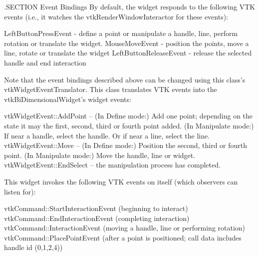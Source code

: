 .S\-E\-C\-T\-I\-O\-N Event Bindings By default, the widget responds to the following V\-T\-K events (i.\-e., it watches the vtk\-Render\-Window\-Interactor for these events)\-: 
\begin{DoxyPre}
   LeftButtonPressEvent - define a point or manipulate a handle, line,
                          perform rotation or translate the widget.
   MouseMoveEvent - position the points, move a line, rotate or translate the widget
   LeftButtonReleaseEvent - release the selected handle and end interaction
 \end{DoxyPre}


Note that the event bindings described above can be changed using this class's vtk\-Widget\-Event\-Translator. This class translates V\-T\-K events into the vtk\-Bi\-Dimensional\-Widget's widget events\-: 
\begin{DoxyPre}
   vtkWidgetEvent::AddPoint -- (In Define mode:) Add one point; depending on the 
                               state it may the first, second, third or fourth 
                               point added. (In Manipulate mode:) If near a handle, 
                               select the handle. Or if near a line, select the line.
   vtkWidgetEvent::Move -- (In Define mode:) Position the second, third or fourth 
                           point. (In Manipulate mode:) Move the handle, line or widget.
   vtkWidgetEvent::EndSelect -- the manipulation process has completed.
 \end{DoxyPre}


This widget invokes the following V\-T\-K events on itself (which observers can listen for)\-: 
\begin{DoxyPre}
   vtkCommand::StartInteractionEvent (beginning to interact)
   vtkCommand::EndInteractionEvent (completing interaction)
   vtkCommand::InteractionEvent (moving a handle, line or performing rotation)
   vtkCommand::PlacePointEvent (after a point is positioned; 
                                call data includes handle id (0,1,2,4))
 \end{DoxyPre}


